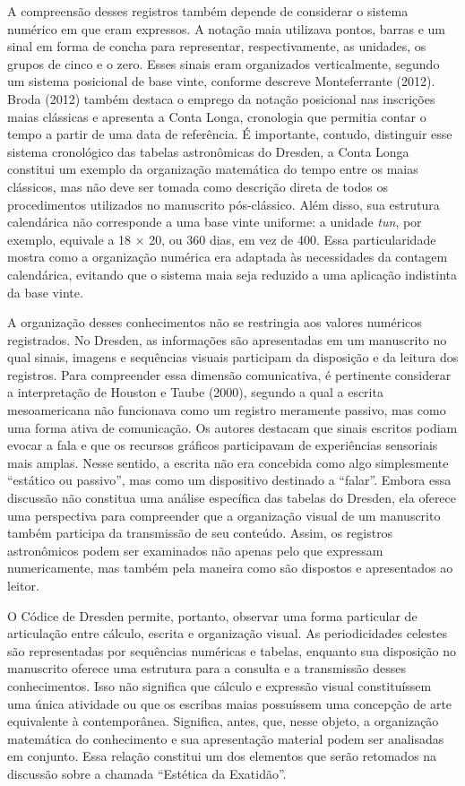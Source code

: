 \documentclass[11pt, a4paper]{article}
\begin{document}
A compreensão desses registros também depende de considerar o sistema numérico em que eram expressos. A notação maia utilizava pontos, barras e um sinal em forma de concha para representar, respectivamente, as unidades, os grupos de cinco e o zero. Esses sinais eram organizados verticalmente, segundo um sistema posicional de base vinte, conforme descreve Monteferrante (2012). Broda (2012) também destaca o emprego da notação posicional nas inscrições maias clássicas e apresenta a Conta Longa, cronologia que permitia contar o tempo a partir de uma data de referência. É importante, contudo, distinguir esse sistema cronológico das tabelas astronômicas do Dresden, a Conta Longa constitui um exemplo da organização matemática do tempo entre os maias clássicos, mas não deve ser tomada como descrição direta de todos os procedimentos utilizados no manuscrito pós-clássico. Além disso, sua estrutura calendárica não corresponde a uma base vinte uniforme: a unidade \textit{tun}, por exemplo, equivale a 18 × 20, ou 360 dias, em vez de 400. Essa particularidade mostra como a organização numérica era adaptada às necessidades da contagem calendárica, evitando que o sistema maia seja reduzido a uma aplicação indistinta da base vinte.

A organização desses conhecimentos não se restringia aos valores numéricos registrados. No Dresden, as informações são apresentadas em um manuscrito no qual sinais, imagens e sequências visuais participam da disposição e da leitura dos registros. Para compreender essa dimensão comunicativa, é pertinente considerar a interpretação de Houston e Taube (2000), segundo a qual a escrita mesoamericana não funcionava como um registro meramente passivo, mas como uma forma ativa de comunicação. Os autores destacam que sinais escritos podiam evocar a fala e que os recursos gráficos participavam de experiências sensoriais mais amplas. Nesse sentido, a escrita não era concebida como algo simplesmente “estático ou passivo”, mas como um dispositivo destinado a “falar”. Embora essa discussão não constitua uma análise específica das tabelas do Dresden, ela oferece uma perspectiva para compreender que a organização visual de um manuscrito também participa da transmissão de seu conteúdo. Assim, os registros astronômicos podem ser examinados não apenas pelo que expressam numericamente, mas também pela maneira como são dispostos e apresentados ao leitor.

O Códice de Dresden permite, portanto, observar uma forma particular de articulação entre cálculo, escrita e organização visual. As periodicidades celestes são representadas por sequências numéricas e tabelas, enquanto sua disposição no manuscrito oferece uma estrutura para a consulta e a transmissão desses conhecimentos. Isso não significa que cálculo e expressão visual constituíssem uma única atividade ou que os escribas maias possuíssem uma concepção de arte equivalente à contemporânea. Significa, antes, que, nesse objeto, a organização matemática do conhecimento e sua apresentação material podem ser analisadas em conjunto. Essa relação constitui um dos elementos que serão retomados na discussão sobre a chamada “Estética da Exatidão”.
\end{document}
